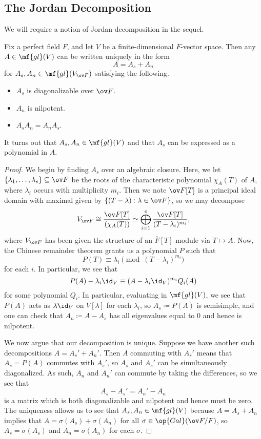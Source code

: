 \documentclass[../notes.tex]{subfiles}
\begin{document}
\subsection{The Jordan Decomposition}
We will require a notion of Jordan decomposition in the sequel.
\begin{proposition}
	Fix a perfect field $F$, and let $V$ be a finite-dimensional $F$-vector space. Then any $A\in\mf{gl}(V)$ can be written uniquely in the form
	\[A=A_s+A_n\]
	for $A_s,A_n\in\mf{gl}(V_{\ov F})$ satisfying the following.
	\begin{itemize}
		\item $A_s$ is diagonalizable over $\ov F$.
		\item $A_n$ is nilpotent.
		\item $A_sA_n=A_nA_s$.
	\end{itemize}
	It turns out that $A_s,A_n\in\mf{gl}(V)$ and that $A_s$ can be expressed as a polynomial in $A$.
\end{proposition}
\begin{proof}
	We begin by finding $A_s$ over an algebraic closure. Here, we let $\{\lambda_1,\ldots,\lambda_e\}\subseteq\ov F$ be the roots of the characteristic polynomial $\chi_A(T)$ of $A$, where $\lambda_i$ occurs with multiplicity $m_i$. Then we note $\ov F[T]$ is a principal ideal domain with maximal given by $\{(T-\lambda):\lambda\in\ov F\}$, so we may decompose
	\[V_{\ov F}\cong\frac{\ov F[T]}{(\chi_A(T))}\simeq\bigoplus_{i=1}^e\frac{\ov F[T]}{(T-\lambda_i)^{m_i}},\]
	where $V_{\ov F}$ has been given the structure of an $\overline F[T]$-module via $T\mapsto A$. Now, the Chinese remainder theorem grants us a polynomial $P$ such that
	\[P(T)\equiv\lambda_i\pmod{(T-\lambda_i)^{m_i}}\]
	for each $i$. In particular, we see that
	\[P(A)-\lambda_i{\id_V}\equiv(A-\lambda_i{\id_V})^{m_i}Q_i(A)\]
	for some polynomial $Q_i$. In particular, evaluating in $\mf{gl}(V)$, we see that $P(A)$ acts as $\lambda\id_V$ on $V[\lambda]$ for each $\lambda_i$, so $A_s\coloneqq P(A)$ is semisimple, and one can check that $A_n\coloneqq A-A_s$ has all eigenvalues equal to $0$ and hence is nilpotent.

	We now argue that our decomposition is unique. Suppose we have another such decompositions $A=A_s'+A_n'$. Then $A$ commuting with $A_s'$ means that $A_s=P(A)$ commutes with $A_s'$, so $A_s$ and $A_s'$ can be simultaneously diagonalized. As such, $A_n$ and $A_n'$ can commute by taking the differences, so we see that
	\[A_s-A_s'=A_n'-A_n\]
	is a matrix which is both diagonalizable and nilpotent and hence must be zero. The uniqueness allows us to see that $A_s,A_n\in\mf{gl}(V)$ because $A=A_s+A_n$ implies that $A=\sigma(A_s)+\sigma(A_n)$ for all $\sigma\in\op{Gal}(\ov F/F)$, so $A_s=\sigma(A_s)$ and $A_n=\sigma(A_n)$ for each $\sigma$.
\end{proof}
\end{document}
